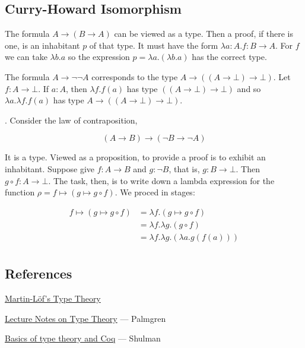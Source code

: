 \subsection{Curry-Howard Isomorphism}

 The formula $A \to (B \to A)$ can be viewed as a type.  Then a proof, if there is one, is an inhabitant $p$ of that type. It must have the form $\lambda a: A.f:B \to A$.  For $f$ we can take $\lambda b.a$ so the expression $p = \lambda a.(\lambda b.a)$ has the correct type.




 The formula $A \to \neg \neg A$ corresponds to the type $A \to ((A \to \bot) \to \bot)$.  Let $f : A \to \bot$. If $a:A$, then $\lambda f . f(a)$ has type $((A \to \bot) \to \bot)$ and so $\lambda a. \lambda f . f(a)$ has type  $A \to ((A \to \bot) \to \bot)$.




. Consider the law of contraposition,

$$
(A \to B) \to (\neg B \to \neg A)
$$

It is a type.  Viewed as a proposition, to provide a proof is to exhibit an inhabitant.  Suppose give $f : A \to B$ and $g : \neg B$, that is,
$g : B \to \bot$.  Then $g\circ f : A \to \bot$.  The task, then, is to write down a lambda expression for the function $\rho =  f \mapsto (g \mapsto g\circ f)$.  We proced in stages:

\begin{align}
f \mapsto (g \mapsto g\circ f) & = \lambda f .(g \mapsto g\circ f)\\
 & = \lambda f . \lambda g . (g\circ f) \\
& = \lambda f . \lambda g . (\lambda a. g(f(a))) \\
\end{align}

\subsection{References}

\href{http://www.cse.chalmers.se/~smith/handbook.pdf}{Martin-Löf's Type Theory}

\href{http://staff.math.su.se/palmgren/lecturenotesTT.pdf}{Lecture Notes on Type Theory} — Palmgren

\href{https://home.sandiego.edu/~shulman/hottseminar2012/02typetheory-handout2up.pdf}{Basics of type theory and Coq} — Shulman

